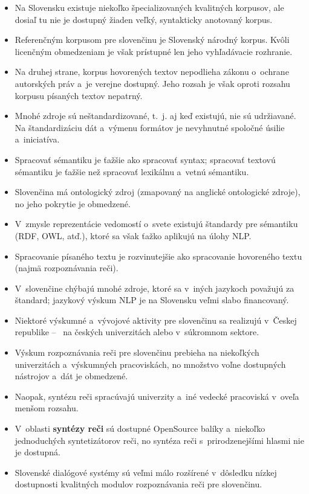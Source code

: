 \begin{multicols}{2}
\begin{itemize}
\item Na Slovensku existuje niekoľko špecializovaných kvalitných korpusov, ale dosiaľ tu nie je dostupný žiaden veľký, syntakticky anotovaný korpus.
\item Referenčným korpusom pre slovenčinu je Slovenský národný korpus. Kvôli licenčným obmedzeniam je však prístupné len jeho vyhľadávacie rozhranie.
\item Na druhej strane, korpus hovorených textov nepodlieha zákonu o~ochrane autorských práv a~je verejne dostupný. Jeho rozsah je však oproti rozsahu korpusu písaných textov nepatrný.
\item Mnohé zdroje sú neštandardizované, t.~j. aj keď existujú, nie sú udržiavané. Na štandardizáciu dát a~výmenu formátov je nevyhnutné spoločné úsilie a~iniciatíva.
\item Spracovať sémantiku je ťažšie ako spracovať syntax; spracovať textovú sémantiku je ťažšie než spracovať lexikálnu a~vetnú sémantiku.
\item Slovenčina má ontologický zdroj (zmapovaný na anglické ontologické zdroje), no jeho pokrytie je obmedzené.
\item V~zmysle reprezentácie vedomostí o~svete existujú štandardy pre sémantiku (RDF, OWL, atď.), ktoré sa však ťažko aplikujú na úlohy NLP.
\item Spracovanie písaného textu je rozvinutejšie ako spracovanie hovoreného textu (najmä rozpoznávania reči).
\item V~slovenčine chýbajú mnohé zdroje, ktoré sa v~iných jazykoch považujú za štandard; jazykový výskum NLP je na Slovensku veľmi slabo financovaný.
\item Niektoré výskumné a~vývojové aktivity pre slovenčinu sa realizujú v~Českej republike – ~na českých univerzitách alebo v~súkromnom sektore.
\item Výskum rozpoznávania reči pre slovenčinu prebieha na niekoľkých univerzitách a~výskumných pracoviskách, no množstvo voľne dostupných nástrojov a~dát je obmedzené.
\item Naopak, syntézu reči spracúvajú univerzity a~iné vedecké pracoviská v~oveľa menšom rozsahu.
\item V~oblasti \textbf{syntézy reči} sú dostupné OpenSource balíky a~niekoľko jednoduchých syntetizátorov reči, no syntéza reči s~prirodzenejšími hlasmi nie je dostupná.
\item Slovenské dialógové systémy sú veľmi málo rozšírené v~dôsledku nízkej dostupnosti kvalitných modulov rozpoznávania reči pre slovenčinu.
\end{itemize}


\end{multicols}
